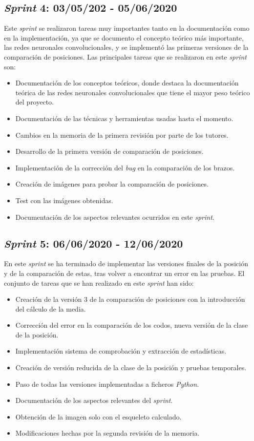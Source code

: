 \subsection{\textit{Sprint} 4: 03/05/202 - 05/06/2020}
Este \textit{sprint} se realizaron tareas muy importantes tanto en la documentación como en la implementación, ya que se documento el concepto teórico más importante, las redes neuronales convolucionales, y se implementó las primeras versiones de la comparación de posiciones. Las principales tareas que se realizaron en este \textit{sprint} son:
\begin{itemize}
	\item Documentación de los conceptos teóricos, donde destaca la documentación teórica de las redes neuronales convolucionales que tiene el mayor peso teórico del proyecto.
	\item Documentación de las técnicas y herramientas usadas hasta el momento.
	\item Cambios en la memoria de la primera revisión por parte de los tutores.
	\item Desarrollo de la primera versión de comparación de posiciones.
	\item Implementación de la corrección del \textit{bug} en la comparación de los brazos.
	\item Creación de imágenes para probar la comparación de posiciones.
	\item Test con las imágenes obtenidas.
	\item Documentación de los aspectos relevantes ocurridos en este \textit{sprint}. 
\end{itemize}

\subsection{\textit{Sprint} 5: 06/06/2020 - 12/06/2020}
En este \textit{sprint} se ha terminado de implementar las versiones finales de la posición y de la comparación de estas, tras volver a encontrar un error en las pruebas. El conjunto de tareas que se han realizado en este \textit{sprint} han sido:
\begin{itemize}
	\item Creación de la versión 3 de la comparación de posiciones con la introducción del cálculo de la media.
	\item Corrección del error en la comparación de los codos, nueva versión de la clase de la posición.
	\item Implementación sistema de comprobación y extracción de estadísticas.
	\item Creación de versión reducida de la clase de la posición y pruebas temporales.
	\item Paso de todas las versiones implementadas a ficheros \textit{Python}.
	\item Documentación de los aspectos relevantes del \textit{sprint}.
	\item Obtención de la imagen solo con el esqueleto calculado.
	\item Modificaciones hechas por la segunda revisión de la memoria.
\end{itemize}

